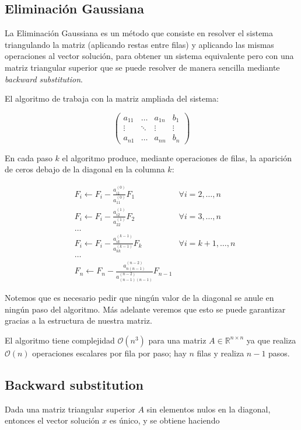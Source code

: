 \subsection{Eliminación Gaussiana}
La Eliminación Gaussiana es un método que consiste en resolver el sistema triangulando la matriz (aplicando restas entre filas) y aplicando las mismas operaciones al vector solución, para obtener un sistema equivalente pero con una matriz triangular superior que se puede resolver de manera sencilla mediante \emph{backward substitution}.

El algoritmo de trabaja con la matriz ampliada del sistema:

\[\left(\begin{array}{ccc|c}
a_{11} & \ldots & a_{1n} & b_1\\
\vdots & \ddots & \vdots & \vdots\\
a_{n1} & \ldots & a_{nn} & b_n
\end{array}\right)\]

En cada paso $k$ el algoritmo produce, mediante operaciones de filas, la aparición de ceros debajo de la diagonal en la columna $k$:

\begin{align*}
&F_i \leftarrow F_i - \frac{a_{i1}^{(0)}}{a_{11}^{(0)}}F_1 &\forall i = 2, \ldots, n \\
&F_i \leftarrow F_i - \frac{a_{i2}^{(1)}}{a_{22}^{(1)}}F_2 &\forall i = 3, \ldots, n \\
&\ldots \\
&F_i \leftarrow F_i - \frac{a_{ik}^{(k - 1)}}{a_{kk}^{(k - 1)}}F_k &\forall i = k + 1, \ldots, n \\
&\ldots \\
&F_n \leftarrow F_n - \frac{a_{n(n-1)}^{(n-2)}}{a_{(n-1)(n-1)}^{(n-2)}}F_{n - 1} &
\end{align*}

Notemos que es necesario pedir que ningún valor de la diagonal se anule en ningún paso del algoritmo. Más adelante veremos que esto se puede garantizar gracias a la estructura de nuestra matriz.

El algoritmo tiene complejidad $\mathcal{O}(n^3)$ para una matriz $A \in \mathbb{R}^{n \times n}$ ya que realiza $\mathcal{O}(n)$ operaciones escalares por fila por paso; hay $n$ filas y realiza $n-1$ pasos.

\subsection{Backward substitution}
Dada una matriz triangular superior $A$ sin elementos nulos en la diagonal, entonces el vector solución $x$ es único, y se obtiene haciendo


